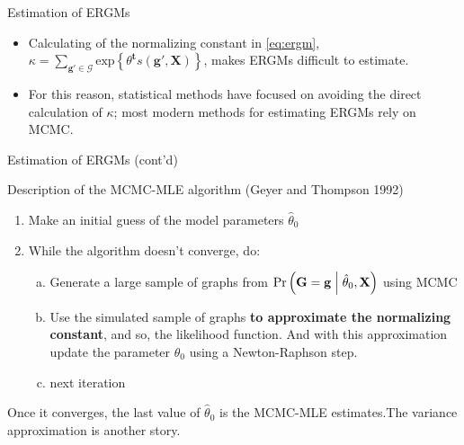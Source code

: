 \documentclass[10pt,ignorenonframetext,aspectratio=169,]{beamer}
\newcommand{\Prcond}[2]{{\mbox{Pr}\left(#1\vphantom{#2}\;\right|\left.\vphantom{#1}#2\right)}}
\newcommand{\sufstats}[1]{s\left(#1\right)}
\renewcommand{\exp}[1]{\mbox{exp}\left\{#1\right\}}
\newcommand{\transpose}[1]{{#1}^\mathbf{t}}
\newcommand{\params}{\theta}
\newcommand{\Graph}{\mathbf{G}}
\newcommand{\graph}{\mathbf{g}}
\newcommand{\GRAPH}{\mathcal{G}}
\newcommand{\Indepvar}{\mathbf{X}}
\begin{document}
\begin{frame}{Estimation of ERGMs}
\protect\hypertarget{estimation-of-ergms}{}

\begin{itemize}
\item
  Calculating of the normalizing constant in \eqref{eq:ergm},
  \(\kappa = \sum_{\graph'\in\GRAPH}\exp{\transpose{\params}\sufstats{\graph', \Indepvar}}\),
  makes ERGMs difficult to estimate.\pause
\item
  For this reason, statistical methods have focused on avoiding the
  direct calculation of \(\kappa\); most modern methods for estimating
  ERGMs rely on MCMC.
\end{itemize}

\end{frame}

\begin{frame}[t]{Estimation of ERGMs (cont'd)}
\protect\hypertarget{estimation-of-ergms-contd}{}

Description of the MCMC-MLE algorithm (Geyer and Thompson 1992) \pause

\begin{enumerate}
\item
  Make an initial guess of the model parameters \(\hat\theta_0\) \pause
\item
  While the algorithm doesn't converge, do: \pause

  \begin{enumerate}
  [a.]
  \item
    Generate a large sample of graphs from
    \(\Prcond{\Graph = \graph}{\hat\theta_0, \Indepvar}\) using MCMC
    \pause
  \item
    Use the simulated sample of graphs \textbf{to approximate the
    normalizing constant}, and so, the likelihood function. And with
    this approximation update the parameter \(\theta_0\) using a
    Newton-Raphson step. \pause
  \item
    next iteration\pause 
  \end{enumerate}
\end{enumerate}

Once it converges, the last value of \(\hat\theta_0\) is the MCMC-MLE
estimates.\pause The variance approximation is another story.

\end{frame}
\end{document}
